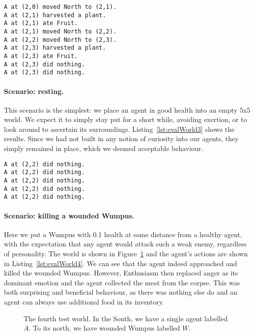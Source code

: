 \noindent
\begin{minipage}{\linewidth}
\begin{lstlisting}[caption=Actions in the scenario ``harvesting all plants''., label=lst:evalWorld2]
A at (2,0) moved North to (2,1).
A at (2,1) harvested a plant.
A at (2,1) ate Fruit.
A at (2,1) moved North to (2,2).
A at (2,2) moved North to (2,3).
A at (2,3) harvested a plant.
A at (2,3) ate Fruit.
A at (2,3) did nothing.
A at (2,3) did nothing.
\end{lstlisting}
\end{minipage}

\paragraph{Scenario: resting.} This scenario is the simplest: we place an agent in good health into an empty 5x5 world. We expect it to simply stay put for a short while, avoiding exertion, or to look around to ascertain its surroundings. Listing~\ref{lst:evalWorld3} shows the results. Since we had not built in any notion of curiosity into our agents, they simply remained in place, which we deemed acceptable behaviour.

\begin{lstlisting}[caption=Actions in the scenario ``resting''., label=lst:evalWorld3]
A at (2,2) did nothing.
A at (2,2) did nothing.
A at (2,2) did nothing.
A at (2,2) did nothing.
A at (2,2) did nothing.
\end{lstlisting}

\paragraph{Scenario: killing a wounded Wumpus.} Here we put a Wumpus with 0.1 health at some distance from a healthy agent, with the expectation that any agent would attack such a weak enemy, regardless of personality. The world is shown in Figure~\ref{fig:evalWorld4} and the agent's actions are shown in Listing~\ref{lst:evalWorld4}. We can see that the agent indeed approached and killed the wounded Wumpus. However, Enthusiasm then replaced anger as its dominant emotion and the agent collected the meat from the corpse. This was both surprising and beneficial behaviour, as there was nothing else do and an agent can always use additional food in its inventory.

\begin{figure}
	\centering
	
	\caption{The fourth test world. In the South, we have a single agent labelled $A$. To its north, we have wounded Wumpus labelled $W$.}
	\label{fig:evalWorld4}
\end{figure}


